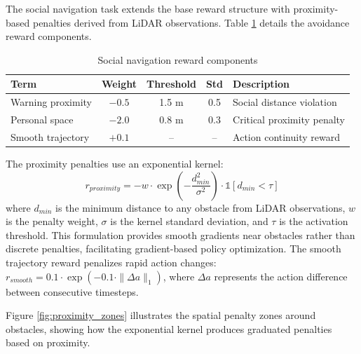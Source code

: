 \documentclass[12pt,a4paper]{article}
\begin{document}
The social navigation task extends the base reward structure with proximity-based penalties derived from LiDAR observations. Table \ref{tab:social_nav_rewards} details the avoidance reward components.

\begin{table}[htbp]
\centering
\caption{Social navigation reward components}
\label{tab:social_nav_rewards}
\begin{tabular}{lcccl}
\toprule
\textbf{Term} & \textbf{Weight} & \textbf{Threshold} & \textbf{Std} & \textbf{Description} \\
\midrule
Warning proximity & $-0.5$ & 1.5 m & 0.5 & Social distance violation \\
Personal space & $-2.0$ & 0.8 m & 0.3 & Critical proximity penalty \\
Smooth trajectory & $+0.1$ & -- & -- & Action continuity reward \\
\bottomrule
\end{tabular}
\end{table}

The proximity penalties use an exponential kernel:
\begin{equation}
r_{proximity} = -w \cdot \exp\left(-\frac{d_{min}^2}{\sigma^2}\right) \cdot \mathbb{1}[d_{min} < \tau]
\end{equation}
where $d_{min}$ is the minimum distance to any obstacle from LiDAR observations, $w$ is the penalty weight, $\sigma$ is the kernel standard deviation, and $\tau$ is the activation threshold. This formulation provides smooth gradients near obstacles rather than discrete penalties, facilitating gradient-based policy optimization. The smooth trajectory reward penalizes rapid action changes: $r_{smooth} = 0.1 \cdot \exp(-0.1 \cdot \|\Delta a\|_1)$, where $\Delta a$ represents the action difference between consecutive timesteps.

Figure \ref{fig:proximity_zones} illustrates the spatial penalty zones around obstacles, showing how the exponential kernel produces graduated penalties based on proximity.
\end{document}
